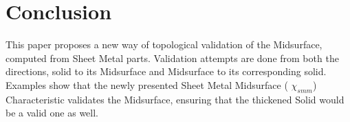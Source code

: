 \section{Conclusion}
This paper proposes a new way of topological validation of the Midsurface, computed from Sheet Metal parts. Validation attempts are done from both the directions, solid to its Midsurface and Midsurface to its corresponding solid. Examples show that the newly presented Sheet Metal Midsurface ( $\chi_{smm}$) Characteristic validates the Midsurface, ensuring that the thickened Solid would be a valid one as well.
